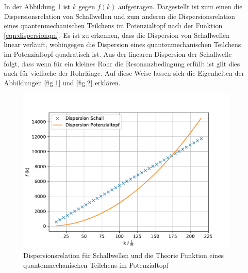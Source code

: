 In der Abbildung \ref{fig.Aufgabe2} ist $k$ gegen $f(k)$ aufgetragen. Dargestellt ist zum einen die Dispersionsrelation von Schallwellen und zum anderen die Dispersionsrelation eines quantenmechanischen Teilchens im Potenzialtopf nach der Funktion \ref{eqn:dispersionqm}.
Es ist zu erkennen, dass die Dispersion von Schallwellen linear verläuft, wohingegen die Dispersion eines quantenmechanischen Teilchens im Potenzialtopf quadratisch ist.
Aus der linearen Dispersion der Schallwelle folgt, dass wenn für ein kleines Rohr die Resonanzbedingung erfüllt ist gilt dies auch für vielfache der Rohrlänge.
Auf diese Weise lassen sich die Eigenheiten der Abbildungen \ref{fig.1} und \ref{fig.2} erklären.
\begin{figure}[h!]
  \centering
  \includegraphics[width=\textwidth]{f(k).pdf}
  \caption{Dispersionsrelation für Schallwellen und die Theorie Funktion eines quantenmechanischen Teilchens im Potenzialtopf}
  \label{fig.Aufgabe2}
\end{figure}
\FloatBarrier


